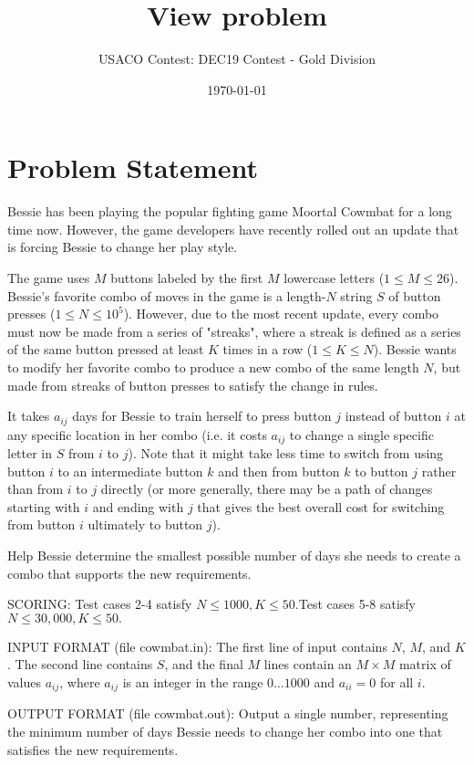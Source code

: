 \documentclass[12pt]{article}
\title{View problem}
\author{USACO Contest: DEC19 Contest - Gold Division}
\date{\today}
\begin{document}
\maketitle

\section*{Problem Statement}

Bessie has been playing the popular fighting game Moortal Cowmbat for a long
time now. However, the game developers have recently rolled out an update that
is forcing Bessie to change her play style.

The game uses $M$ buttons labeled by the first $M$ lowercase letters
($1 \leq M \leq 26$).  Bessie's favorite combo of moves in the game is a
length-$N$ string $S$ of button presses ($1 \leq N \leq 10^5$).  However, due to
the most recent update, every combo must now be made from a series of "streaks",
where a streak is defined as a series of the same button pressed  at least $K$
times in a row ($1 \leq K \leq N$). Bessie wants to modify her favorite combo to
produce a new combo of the same length $N$,  but made from streaks of button
presses to satisfy the change in rules.

It takes $a_{ij}$ days for Bessie to train herself to press button $j$ instead
of  button $i$ at any specific location in her combo (i.e. it costs $a_{ij}$ to
change a single specific letter in $S$ from $i$ to $j$).  Note that it might
take less time to switch from using button $i$ to an intermediate button $k$ and
then from  button $k$ to button $j$ rather than from $i$ to $j$ directly (or
more generally, there may be a path of changes starting with $i$ and ending with
$j$ that gives the best overall cost for switching from button $i$ ultimately to
button $j$).

Help Bessie determine the smallest possible number of days she needs to create a
combo that supports the new requirements.

SCORING:
Test cases 2-4 satisfy $N\le 1000, K\le 50.$Test cases 5-8 satisfy
$N\le 30,000, K\le 50.$ 

INPUT FORMAT (file cowmbat.in):
The first line of input contains $N$, $M$, and $K$. The second line contains
$S$, and the final $M$ lines contain an $M\times M$ matrix of values  $a_{ij}$,
where $a_{ij}$ is an integer in the range $0 \ldots 1000$ and $a_{ii} = 0$ for
all $i$.  

OUTPUT FORMAT (file cowmbat.out):
Output a single number, representing the minimum number of days Bessie needs to
change her combo into one that satisfies the new requirements.
\end{document}
